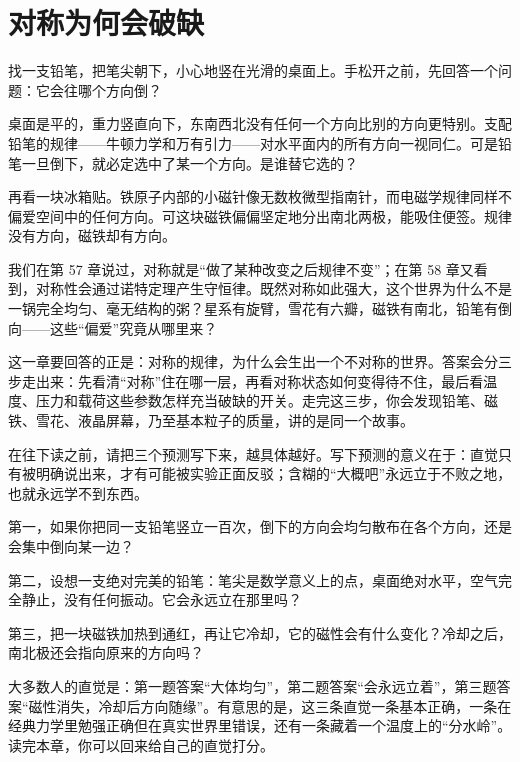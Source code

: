 \chapter{对称为何会破缺}


\begin{mainline}
找一支铅笔，把笔尖朝下，小心地竖在光滑的桌面上。手松开之前，先回答一个问题：它会往哪个方向倒？

桌面是平的，重力竖直向下，东南西北没有任何一个方向比别的方向更特别。支配铅笔的规律——牛顿力学和万有引力——对水平面内的所有方向一视同仁。可是铅笔一旦倒下，就必定选中了某一个方向。是谁替它选的？

再看一块冰箱贴。铁原子内部的小磁针像无数枚微型指南针，而电磁学规律同样不偏爱空间中的任何方向。可这块磁铁偏偏坚定地分出南北两极，能吸住便签。规律没有方向，磁铁却有方向。

我们在第 57 章说过，对称就是“做了某种改变之后规律不变”；在第 58 章又看到，对称性会通过诺特定理产生守恒律。既然对称如此强大，这个世界为什么不是一锅完全均匀、毫无结构的粥？星系有旋臂，雪花有六瓣，磁铁有南北，铅笔有倒向——这些“偏爱”究竟从哪里来？

这一章要回答的正是：对称的规律，为什么会生出一个不对称的世界。答案会分三步走出来：先看清“对称”住在哪一层，再看对称状态如何变得待不住，最后看温度、压力和载荷这些参数怎样充当破缺的开关。走完这三步，你会发现铅笔、磁铁、雪花、液晶屏幕，乃至基本粒子的质量，讲的是同一个故事。
\end{mainline}


\begin{mainline}
在往下读之前，请把三个预测写下来，越具体越好。写下预测的意义在于：直觉只有被明确说出来，才有可能被实验正面反驳；含糊的“大概吧”永远立于不败之地，也就永远学不到东西。

第一，如果你把同一支铅笔竖立一百次，倒下的方向会均匀散布在各个方向，还是会集中倒向某一边？

第二，设想一支绝对完美的铅笔：笔尖是数学意义上的点，桌面绝对水平，空气完全静止，没有任何振动。它会永远立在那里吗？

第三，把一块磁铁加热到通红，再让它冷却，它的磁性会有什么变化？冷却之后，南北极还会指向原来的方向吗？

大多数人的直觉是：第一题答案“大体均匀”，第二题答案“会永远立着”，第三题答案“磁性消失，冷却后方向随缘”。有意思的是，这三条直觉一条基本正确，一条在经典力学里勉强正确但在真实世界里错误，还有一条藏着一个温度上的“分水岭”。读完本章，你可以回来给自己的直觉打分。
\end{mainline}

